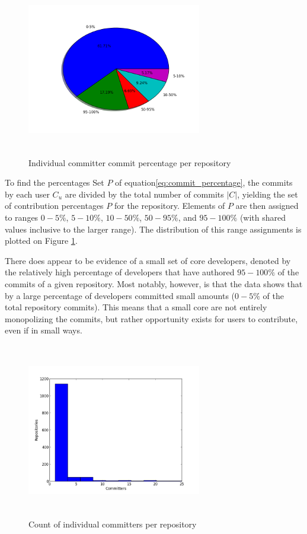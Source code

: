 \documentclass{proc}
\begin{document}
{{{{{{{\begin{figure}
\includegraphics[height=3in,width=3in]{images/committers_percentage_pie_chart.png}
\caption{Individual committer commit percentage per repository}
\label{fig:committers_percentage_pie_chart}
\end{figure}

To find the percentages Set $P$ of equation\ref{eq:commit_percentage}, the commits by each user $C_u$ are divided by the total number of commits $|C|$, yielding the set of contribution percentages $P$ for the repository. Elements of $P$ are then assigned to ranges $0-5\%$, $5-10\%$, $10-50\%$, $50-95\%$, and $95-100\%$ (with shared values inclusive to the larger range). The distribution of this range assignments is plotted on Figure \ref{fig:committers_percentage_pie_chart}.

There does appear to be evidence of a small set of core developers, denoted by the relatively high percentage of developers that have authored $95-100\%$ of the commits of a given repository. Most notably, however, is that the data shows that by a large percentage of developers committed small amounts ($0-5\%$ of the total repository commits). This means that a small core are not entirely monopolizing the commits, but rather opportunity exists for users to contribute, even if in small ways.

\begin{figure}
\includegraphics[height=3in,width=3in]{images/committers_histogram.png}
\caption{Count of individual committers per repository}
\label{fig:committers_histogram}
\end{figure}

}}}}}}}
\end{document}
